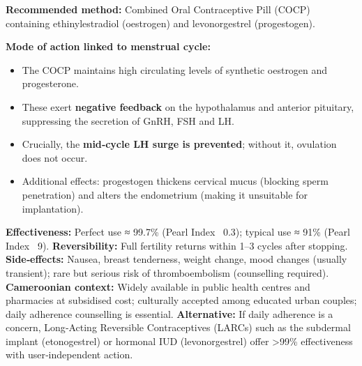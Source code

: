 \documentclass[11pt]{article}
\newcommand{\cle}[1]{{\popxbold\color{popdark}#1}}
\begin{document}
\begin{exemplebox}
\textbf{Recommended method:} Combined Oral Contraceptive Pill (COCP) containing ethinylestradiol (oestrogen) and levonorgestrel (progestogen).

\textbf{Mode of action linked to menstrual cycle:}
\begin{itemize}
    \item The COCP maintains high circulating levels of synthetic oestrogen and progesterone.
    \item These exert \textbf{negative feedback} on the hypothalamus and anterior pituitary, suppressing the secretion of \cle{GnRH}, \cle{FSH} and \cle{LH}.
    \item Crucially, the \textbf{mid‑cycle LH surge is prevented}; without it, \cle{ovulation} does not occur.
    \item Additional effects: progestogen thickens \cle{cervical mucus} (blocking sperm penetration) and alters the \cle{endometrium} (making it unsuitable for implantation).
\end{itemize}

\textbf{Effectiveness:} Perfect use ≈ 99.7\% (Pearl Index ~0.3); typical use ≈ 91\% (Pearl Index ~9).
\textbf{Reversibility:} Full fertility returns within 1–3 cycles after stopping.
\textbf{Side‑effects:} Nausea, breast tenderness, weight change, mood changes (usually transient); rare but serious risk of thromboembolism (counselling required).
\textbf{Cameroonian context:} Widely available in public health centres and pharmacies at subsidised cost; culturally accepted among educated urban couples; daily adherence counselling is essential.
\textbf{Alternative:} If daily adherence is a concern, Long‑Acting Reversible Contraceptives (LARCs) such as the subdermal implant (etonogestrel) or hormonal IUD (levonorgestrel) offer >99\% effectiveness with user‑independent action.
\end{exemplebox}
\end{document}
